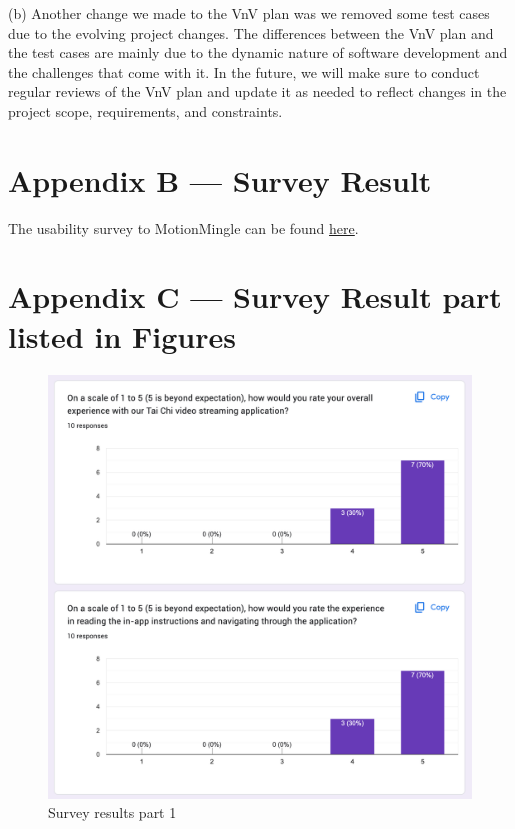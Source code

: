 \documentclass[12pt, titlepage]{article}
\begin{document}
(b) Another change we made to the VnV plan was we removed some test cases due to
the evolving project changes. The differences between the VnV plan and the test
cases are mainly due to the dynamic nature of software development and the
challenges that come with it. In the future, we will make sure to conduct
regular reviews of the VnV plan and update it as needed to reflect changes in
the project scope, requirements, and constraints.

\section*{Appendix B --- Survey Result}
The usability survey to MotionMingle can be found \href{https://docs.google.com/forms/d/e/1FAIpQLSchSdc_kHr98yHP8QPyWItHoP-dj_hJnuEtNByH0V2M_iDjWw/viewform}{here}.

\section*{Appendix C --- Survey Result part listed in Figures}
\begin{figure}[h]
  \centering
  \includegraphics[width=1.0\linewidth]{surveyp1.png}
  \caption{Survey results part 1}
  \label{fig:surveyp1}
\end{figure}
\end{document}
